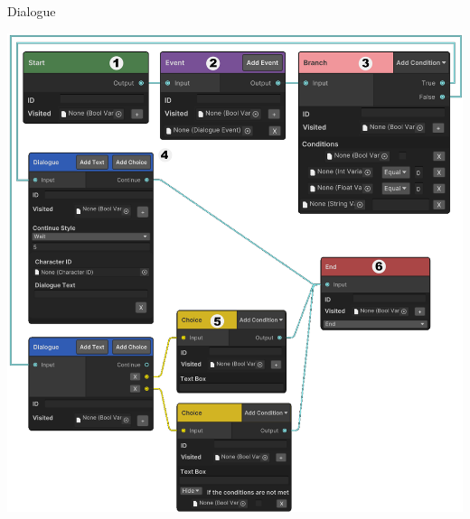 \documentclass[portrait,a0paper,fontscale=0.35]{baposter}
\begin{document}
\begin{poster}
\begin{posterbox}[column=1, span=1, name=ds, below=is, %
]{Dialogue}
\begin{center}
\includegraphics[width=0.7\linewidth]{img/nodes2.png}
\end{center}

\end{posterbox}



\end{poster}
\end{document}
